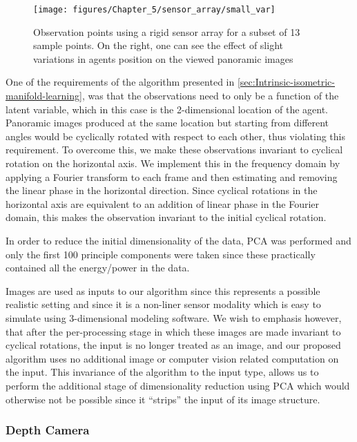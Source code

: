 	\begin{figure}[h]
		\begin{centering}
			\texttt{[image: figures/Chapter\_5/sensor\_array/small\_var]}
		\end{centering}
		\caption{Observation points using a rigid sensor array for a subset of 13 sample points. On the right, one can see the effect of slight variations in agents position on the viewed panoramic images \label{fig:sensor_array_localization}}
	\end{figure}
	
	One of the requirements of the algorithm presented in \cref{sec:Intrinsic-isometric-manifold-learning}, was that the observations need to only be a function of the latent variable, which in this case is the 2-dimensional location of the agent. Panoramic images produced at the same location but starting from different angles would be cyclically rotated with respect to each other, thus violating this requirement. To overcome this, we make these observations invariant to cyclical rotation on the horizontal axis. We implement this in the frequency domain by applying a Fourier transform to each frame and then estimating and removing the linear phase in the horizontal direction. Since cyclical rotations in the horizontal axis are equivalent to an addition of linear phase in the Fourier domain, this makes the observation invariant to the initial cyclical rotation. 
	
	In order to reduce the initial dimensionality of the data, \ac{PCA} was performed and only the first 100 principle components were taken since these practically contained all the energy/power in the data.
	
	Images are used as inputs to our algorithm since this represents a possible realistic setting and since it is a non-liner sensor modality which is easy to simulate using 3-dimensional
	modeling software. We wish to emphasis however, that after the per-processing stage in which these images are made invariant to cyclical rotations, the input is no longer treated as an image, and our proposed algorithm uses no additional image or computer vision related computation on the input. This invariance of the algorithm to the input type, allows us to perform the additional stage of dimensionality reduction using \ac{PCA} which would otherwise not be possible since it ``strips'' the input of its image structure.
	
	\subsubsection*{Depth Camera}
	
